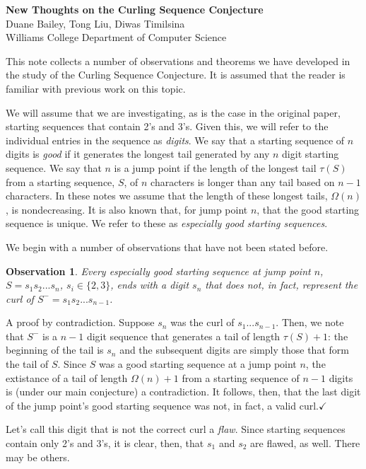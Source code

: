 \documentclass[11pt]{article}
\def\emph#1{{\em #1\/}}
\def\term#1{\emph{#1}}
\def\QED{$\checkmark$}
\def\ni{\noindent}
\def\tail#1{{\tau(#1)}}
\def\om#1{{\Omega(#1)}}
\newtheorem{obs}{Observation}
\def\Proof{\ni{\bf Proof:} }
\begin{document}
\begin{center}
{\bf New Thoughts on the Curling Sequence Conjecture}\\
Duane Bailey, Tong Liu, Diwas Timilsina\\
Williams College Department of Computer Science\\
\end{center}

This note collects a number of observations and theorems we have developed in the study
of the Curling Sequence Conjecture.  It is assumed that the reader is familiar with 
previous work on this topic.

We will assume that we are investigating, as is the case in the original paper, starting
sequences that contain 2's and 3's.  Given this, we will refer to the individual entries
in the sequence as \term{digits}.  We say that a starting sequence of $n$ digits is \term{good} if it
generates the longest tail generated by any $n$ digit starting sequence.  We say that $n$ is a
jump point if the length of the longest tail $\tail{S}$ from a starting sequence, $S$, of $n$ characters is longer
than any tail based on $n-1$ characters.  In these notes we assume that the length
of these longest tails, $\om{n}$, is nondecreasing.  It is also known that, for jump point $n$, that the
good starting sequence is unique.  We refer to these as \term{especially good starting sequences}.

We begin with a number of observations that have not been stated before.

\begin{obs}Every especially good starting sequence at jump point $n$, $S=s_1s_2...s_n$, $s_i\in\{2,3\}$, ends with a digit $s_n$ that does not, in fact,
represent the curl of $S^-=s_1s_2...s_{n-1}$.
\end{obs}

\Proof A proof by contradiction.  Suppose $s_n$ was the curl of
$s_1...s_{n-1}$.  Then, we note that $S^-$ is a $n-1$ digit sequence that
generates a tail of length $\tail{S}+1$: the beginning of the tail is $s_n$
and the subsequent digits are simply those that form the tail of
$S$.  Since $S$ was a good starting sequence at a jump point $n$, the extistance
of a tail of length $\om{n}+1$ from a starting sequence of $n-1$ digits is (under our main conjecture) a 
contradiction.  It follows, then, that the last digit of the jump point's good
starting sequence was not, in fact, a valid curl.\QED

Let's call this digit that is not the correct curl a \term{flaw}.  Since starting
sequences contain only 2's and 3's, it is clear, then, that $s_1$ and $s_2$ are flawed, 
as well.  There may be others.
\end{document}
